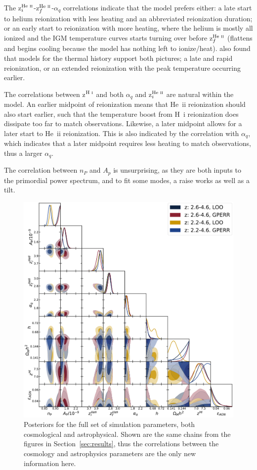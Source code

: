 \documentclass[a4paper,11pt]{article}
\begin{document}
The z$^{\text{He~{\sc ii}}}_i$-z$^{\text{He~{\sc ii}}}_f$-$\alpha_q$ correlations indicate that the model prefers either: a late start to helium reionization with less heating and an abbreviated reionization duration; or an early start to reionization with more heating, where the helium is mostly all ionized and the IGM temperature curves starts turning over before z$^{\text{He~{\sc ii}}}_f$ (flattens and begins cooling because the model has nothing left to ionize/heat).
\cite{2021MNRAS.506.4389G} also found that models for the thermal history support both pictures; a late and rapid reionization, or an extended reionization with the peak temperature occurring earlier.

The correlations between z$^{\text{H~{\sc i}}}$ and both $\alpha_q$ and z$^{\text{He~{\sc ii}}}_i$ are natural within the model.
An earlier midpoint of reionization means that He~{\sc ii} reionization should also start earlier, such that the temperature boost from H~{\sc i} reionization does dissipate too far to match observations.
Likewise, a later midpoint allows for a later start to He~{\sc ii} reionization.
This is also indicated by the correlation with $\alpha_q$, which indicates that a later midpoint requires less heating to match observations, thus a larger $\alpha_q$.

The correlation between $n_P$ and $A_p$ is unsurprising, as they are both inputs to the primordial power spectrum, and to fit some modes, a raise works as well as a tilt.

\begin{figure}
    \centering
    \includegraphics[width=\textwidth]{figures/allp_corner.pdf}
    \caption{\label{fig:full_posterior}
    Posteriors for the full set of simulation parameters, both cosmological and astrophysical.
    Shown are the same chains from the figures in Section~\ref{sec:results}, thus the correlations between the cosmology and astrophysics parameters are the only new information here.
    }
\end{figure}
\end{document}
